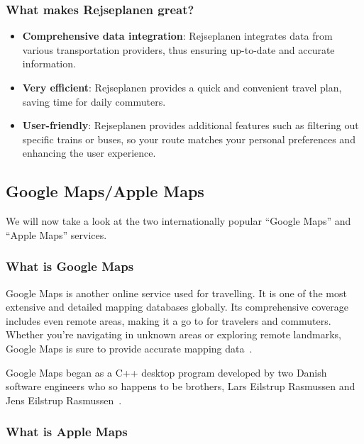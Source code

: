 \subsubsection{What makes Rejseplanen great?}\label{subsubsec:what-makes-rejseplanen-great?}

\begin{itemize}
    \item \textbf{Comprehensive data integration}: Rejseplanen integrates data from various transportation providers,
    thus ensuring up-to-date and accurate information.
    \item \textbf{Very efficient}: Rejseplanen provides a quick and convenient travel plan, saving time for daily
    commuters.
    \item \textbf{User-friendly}: Rejseplanen provides additional features such as filtering out specific trains or
    buses, so your route matches your personal preferences and enhancing the user experience.
\end{itemize}

\subsection{Google Maps/Apple Maps}\label{subsec:google-maps-/-apple-maps}

We will now take a look at the two internationally popular ``Google Maps'' and ``Apple Maps'' services.

\subsubsection{What is Google Maps}

Google Maps is another online service used for travelling.
It is one of the most extensive and detailed mapping databases globally.
Its comprehensive coverage includes even remote areas, making it a go to for travelers and commuters.
Whether you're navigating in unknown areas or exploring remote landmarks, Google Maps is sure to provide accurate
mapping data~\cite{googlemaps2023}.

Google Maps began as a C++ desktop program developed by two Danish software engineers who so happens to be brothers,
Lars Eilstrup Rasmussen and Jens Eilstrup Rasmussen~\cite{googlemaps2023}.

\subsubsection{What is Apple Maps}


